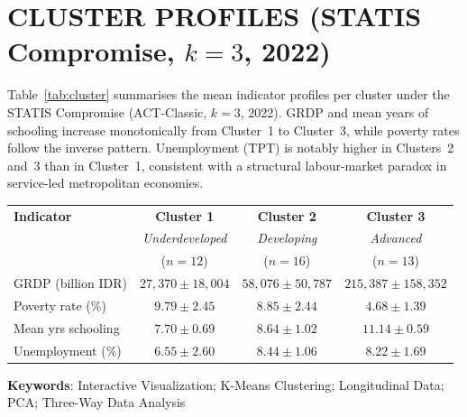 \documentclass[11pt, a4paper]{article}
\begin{document}
\vspace{10pt}

\section*{CLUSTER PROFILES (STATIS Compromise, $k=3$, 2022)}

\noindent
Table~\ref{tab:cluster} summarises the mean indicator profiles per cluster
under the STATIS Compromise (ACT-Classic, $k=3$, 2022).
GRDP and mean years of schooling increase monotonically from Cluster~1 to
Cluster~3, while poverty rates follow the inverse pattern.
Unemployment (TPT) is notably higher in Clusters~2 and~3 than in
Cluster~1, consistent with a structural labour-market paradox in
service-led metropolitan economies.

\vspace{6pt}

\begin{center}
{\small
\begin{tabular}{lccc}
\toprule
\textbf{Indicator} & \textbf{Cluster 1} & \textbf{Cluster 2} & \textbf{Cluster 3} \\
                   & \textit{Underdeveloped} & \textit{Developing} & \textit{Advanced} \\
                   & ($n=12$) & ($n=16$) & ($n=13$) \\
\midrule
GRDP (billion IDR) & $27{,}370 \pm 18{,}004$ & $58{,}076 \pm 50{,}787$ & $215{,}387 \pm 158{,}352$ \\
Poverty rate (\%)  & $9.79 \pm 2.45$  & $8.85 \pm 2.44$  & $4.68 \pm 1.39$  \\
Mean yrs schooling & $7.70 \pm 0.69$  & $8.64 \pm 1.02$  & $11.14 \pm 0.59$ \\
Unemployment (\%)  & $6.55 \pm 2.60$  & $8.44 \pm 1.06$  & $8.22 \pm 1.69$  \\
\bottomrule
\end{tabular}
\label{tab:cluster}
}
\end{center}

\vspace{8pt}

\noindent
\textbf{Keywords}\quad:\quad
Interactive Visualization; K-Means Clustering; Longitudinal Data; PCA; Three-Way Data Analysis
\end{document}
